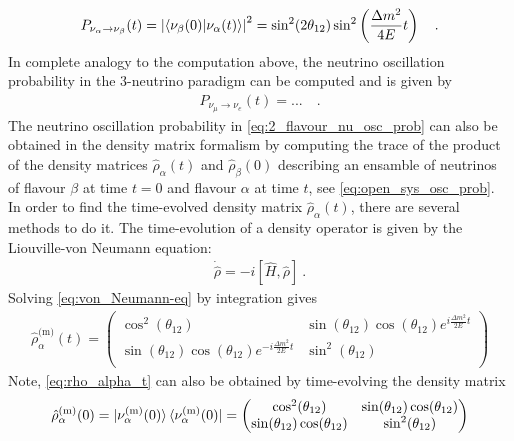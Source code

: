 %
\begin{align} \label{eq:2_flavour_nu_osc_prob}
    P_{\nu_\alpha \rightarrow \nu_\beta} (t) = \left|\braket{\nu_\beta(0)|\nu_\alpha(t)} \right|^2 = \sin^2(2\theta_{12}) \sin^2\left(\frac{\Delta m ^2}{4E}t\right) \quad \text{.}
\end{align}
%
In complete analogy to the computation above, the neutrino oscillation probability in the $3$-neutrino paradigm can be computed and is given by
%
\begin{align} \label{eq:3_flavour_nu_osc_prob}
    P_{\nu_\mu \rightarrow \nu_e} (t) = ... \quad \text{.}
\end{align}
%
The neutrino oscillation probability in \cref{eq:2_flavour_nu_osc_prob} can also be obtained in the density matrix formalism by computing the trace of the product of the density matrices  $\hat{\rho}_\alpha(t)$ and $\hat{\rho}_\beta(0)$ describing an ensamble of neutrinos of flavour $\beta$ at time $t=0$ and flavour $\alpha$ at time $t$, see \cref{eq:open_sys_osc_prob}. In order to find the time-evolved density matrix $\hat{\rho}_\alpha(t)$, there are several methods to do it. The time-evolution of a density operator is given by the Liouville-von Neumann equation: 
%
\begin{align} \label{eq:von_Neumann-eq}
    \dot{\hat{\rho}} = -i [\hat{H},\hat{\rho} ] \ \text{.}
\end{align}
%
Solving \cref{eq:von_Neumann-eq} by integration gives
%
\begin{align} \label{eq:rho_alpha_t}
    \hat{\rho}^\text{(m)}_\alpha(t) =
    \begin{pmatrix}
        \cos^2(\theta_{12}) & \sin(\theta_{12})\cos(\theta_{12})e^{i\frac{\Delta m^2}{2E}t} \\
        \sin(\theta_{12})\cos(\theta_{12})e^{-i\frac{\Delta m^2}{2E}t} & \sin^2(\theta_{12}) \\
    \end{pmatrix}
\end{align}
%
Note, \cref{eq:rho_alpha_t} can also be obtained by time-evolving the density matrix
%
\begin{align} \label{eq:rho_alpha_0}
    \hat{\rho}^\text{(m)}_\alpha(0) = \ket{\nu^\text{(m)}_\alpha(0)} \bra{\nu^\text{(m)}_\alpha(0)} =
    \begin{pmatrix}
        \cos^2(\theta_{12}) & \sin(\theta_{12})\cos(\theta_{12}) \\
        \sin(\theta_{12})\cos(\theta_{12}) & \sin^2(\theta_{12}) \\
    \end{pmatrix}
\end{align}
